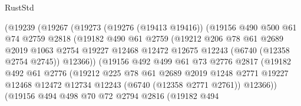 \begin{lexlean}{RustStd}
\begin{coremodule}
                      (@19239
                        (@19267
                          (@19273
                            (@19276 (@19413 @19416))
                            (@19156
                              @490
                              @500
                              @61
                              @74
                              @2759
                              @2818
                              (@19182
                                @490
                                @61
                                @2759
                                (@19212
                                  @206
                                  @78
                                  @61
                                  @2689
                                  @2019
                                  @1063
                                  @2754
                                  @19227
                                  @12468
                                  @12472
                                  @12675
                                  @12243
                                  (@6740 (@12358 @2754 @2745))
                                  @12366))
                              (@19156
                                @492
                                @499
                                @61
                                @73
                                @2776
                                @2817
                                (@19182
                                  @492
                                  @61
                                  @2776
                                  (@19212
                                    @225
                                    @78
                                    @61
                                    @2689
                                    @2019
                                    @1248
                                    @2771
                                    @19227
                                    @12468
                                    @12472
                                    @12734
                                    @12243
                                    (@6740 (@12358 @2771 @2761))
                                    @12366))
                                (@19156
                                  @494
                                  @498
                                  @70
                                  @72
                                  @2794
                                  @2816
                                  (@19182
                                    @494

\end{coremodule}
\end{lexlean}
